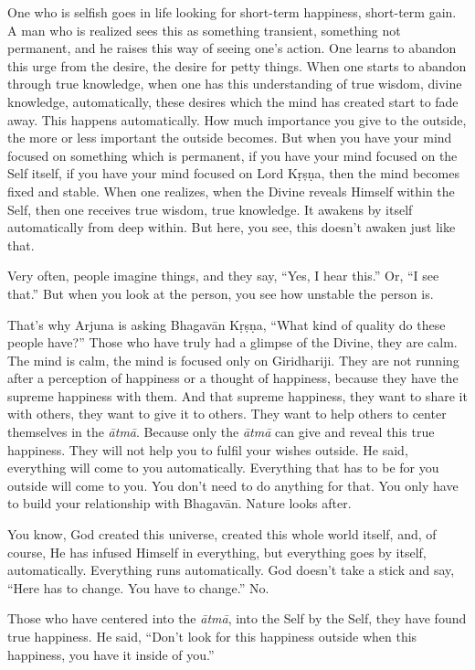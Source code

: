 One who is selfish goes in life looking for short-term happiness, short-term gain. A man who is realized sees this as something transient, something not permanent, and he raises this way of seeing one’s action. One learns to abandon this urge from the desire, the desire for petty things. When one starts to abandon through true knowledge, when one has this understanding of true wisdom, divine knowledge, automatically, these desires which the mind has created start to fade away. This happens automatically. How much importance you give to the outside, the more or less important the outside becomes. But when you have your mind focused on something which is permanent, if you have your mind focused on the Self itself, if you have your mind focused on Lord Kṛṣṇa, then the mind becomes fixed and stable. When one realizes, when the Divine reveals Himself within the Self, then one receives true wisdom, true knowledge. It awakens by itself automatically from deep within. But here, you see, this doesn’t awaken just like that.

Very often, people imagine things, and they say, “Yes, I hear this.” Or, “I see that.” But when you look at the person, you see how unstable the person is.

That’s why Arjuna is asking Bhagavān Kṛṣṇa, “What kind of quality do these people have?” Those who have truly had a glimpse of the Divine, they are calm. The mind is calm, the mind is focused only on Giridhariji. They are not running after a perception of happiness or a thought of happiness, because they have the supreme happiness with them. And that supreme happiness, they want to share it with others, they want to give it to others. They want to help others to center themselves in the \textit{ātmā}. Because only the \textit{ātmā} can give and reveal this true happiness. They will not help you to fulfil your wishes outside. He said, everything will come to you automatically. Everything that has to be for you outside will come to you. You don’t need to do anything for that. You only have to build your relationship with Bhagavān. Nature looks after.

You know, God created this universe, created this whole world itself, and, of course, He has infused Himself in everything, but everything goes by itself, automatically. Everything runs automatically. God doesn’t take a stick and say, “Here has to change. You have to change.” No.

Those who have centered into the \textit{ātmā}, into the Self by the Self, they have found true happiness. He said, “Don’t look for this happiness outside when this happiness, you have it inside of you.”

